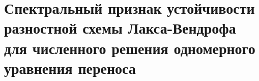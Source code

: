 \documentclass[__main__.tex]{subfiles}
\begin{document}
\section{Спектральный признак устойчивости разностной схемы Лакса-Вендрофа для численного решения одномерного уравнения переноса}
\end{document}
